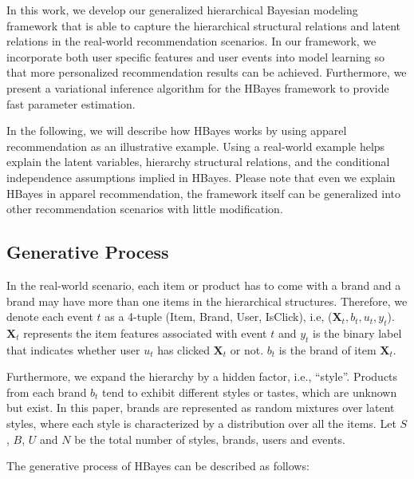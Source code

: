 In this work, we develop our generalized hierarchical Bayesian modeling framework that is able to capture the hierarchical structural relations and latent relations in the real-world recommendation scenarios. In our framework, we incorporate both user specific features and user events into model learning so that more personalized recommendation results can be achieved. Furthermore, we present a variational inference algorithm for the HBayes framework to provide fast parameter estimation.

In the following, we will describe how HBayes works by using apparel recommendation as an illustrative example. Using a real-world example helps explain the latent variables, hierarchy structural relations, and the conditional independence assumptions implied in HBayes. Please note that even we explain HBayes in apparel recommendation, the framework itself can be generalized into other recommendation scenarios with little modification. 



\subsection{Generative Process}

In the real-world scenario, each item or product has to come with a brand and a brand may have more than one items in the hierarchical structures. Therefore, we denote each event $t$ as a 4-tuple (Item, Brand, User, IsClick), i.e, ($\mathbf{X}_t, b_t, u_t, y_t$). $\mathbf{X}_t$ represents the item features associated with event $t$ and $y_t$ is the binary label that indicates whether user $u_t$ has clicked $\mathbf{X}_t$ or not. $b_t$ is the brand of item $\mathbf{X}_t$. 

Furthermore, we expand the hierarchy by a hidden factor, i.e., ``style''. Products from each brand $b_t$ tend to exhibit different styles or tastes, which are unknown but exist. In this paper, brands are represented as random mixtures over latent styles, where each style is characterized by a distribution over all the items. Let $S$, $B$, $U$ and $N$ be the total number of styles, brands, users and events.

The generative process of HBayes can be described as follows:

